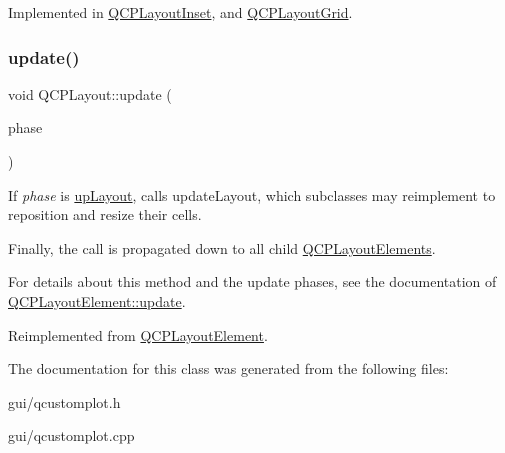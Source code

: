 Implemented in \hyperlink{classQCPLayoutInset_abf2e8233f5b7051220907e62ded490a2}{Q\+C\+P\+Layout\+Inset}, and \hyperlink{classQCPLayoutGrid_a17dd220234d1bbf8835abcc666384d45}{Q\+C\+P\+Layout\+Grid}.

\mbox{\label{classQCPLayout_a48ecc9c98ea90b547c3e27a931a8f7bd}} 
\subsubsection{\texorpdfstring{update()}{update()}}
{\footnotesize\ttfamily void Q\+C\+P\+Layout\+::update (\begin{DoxyParamCaption}\item[{\hyperlink{classQCPLayoutElement_a0d83360e05735735aaf6d7983c56374d}{Update\+Phase}}]{phase }\end{DoxyParamCaption})\hspace{0.3cm}{\ttfamily [virtual]}}

If {\itshape phase} is \hyperlink{classQCPLayoutElement_a0d83360e05735735aaf6d7983c56374da5d1ccf5d79967c232c3c511796860045}{up\+Layout}, calls update\+Layout, which subclasses may reimplement to reposition and resize their cells.

Finally, the call is propagated down to all child \hyperlink{classQCPLayoutElement}{Q\+C\+P\+Layout\+Elements}.

For details about this method and the update phases, see the documentation of \hyperlink{classQCPLayoutElement_a929c2ec62e0e0e1d8418eaa802e2af9b}{Q\+C\+P\+Layout\+Element\+::update}. 

Reimplemented from \hyperlink{classQCPLayoutElement_a929c2ec62e0e0e1d8418eaa802e2af9b}{Q\+C\+P\+Layout\+Element}.



The documentation for this class was generated from the following files\+:\begin{DoxyCompactItemize}
\item 
gui/qcustomplot.\+h\item 
gui/qcustomplot.\+cpp\end{DoxyCompactItemize}
